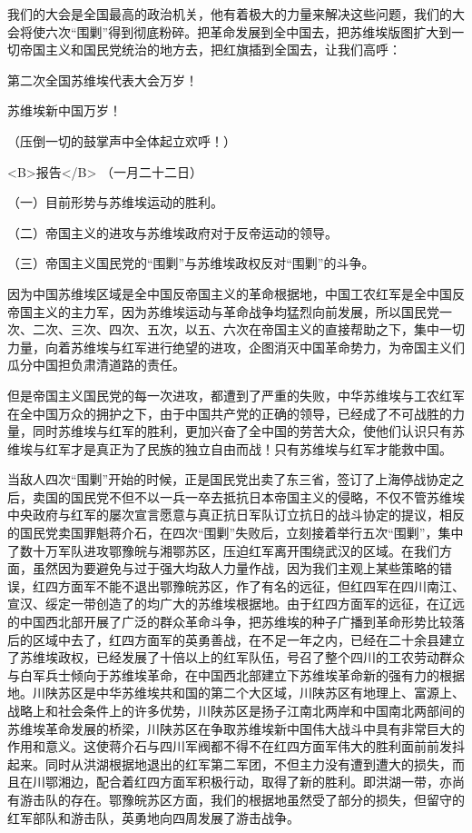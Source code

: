 我们的大会是全国最高的政治机关，他有着极大的力量来解决这些问题，我们的大会将使六次“围剿”得到彻底粉碎。把革命发展到全中国去，把苏维埃版图扩大到一切帝国主义和国民党统治的地方去，把红旗插到全国去，让我们高呼：

第二次全国苏维埃代表大会万岁！

苏维埃新中国万岁！

（压倒一切的鼓掌声中全体起立欢呼！）


<B>报告</B>
（一月二十二日）

（一）目前形势与苏维埃运动的胜利。

（二）帝国主义的进攻与苏维埃政府对于反帝运动的领导。

（三）帝国主义国民党的“围剿”与苏维埃政权反对“围剿”的斗争。

因为中国苏维埃区域是全中国反帝国主义的革命根据地，中国工农红军是全中国反帝国主义的主力军，因为苏维埃运动与革命战争均猛烈向前发展，所以国民党一次、二次、三次、四次、五次，以五、六次在帝国主义的直接帮助之下，集中一切力量，向着苏维埃与红军进行绝望的进攻，企图消灭中国革命势力，为帝国主义们瓜分中国担负肃清道路的责任。

但是帝国主义国民党的每一次进攻，都遭到了严重的失败，中华苏维埃与工农红军在全中国万众的拥护之下，由于中国共产党的正确的领导，已经成了不可战胜的力量，同时苏维埃与红军的胜利，更加兴奋了全中国的劳苦大众，使他们认识只有苏维埃与红军才是真正为了民族的独立自由而战！只有苏维埃与红军才能救中国。

当敌人四次“围剿”开始的时候，正是国民党出卖了东三省，签订了上海停战协定之后，卖国的国民党不但不以一兵一卒去抵抗日本帝国主义的侵略，不仅不管苏维埃中央政府与红军的屡次宣言愿意与真正抗日军队订立抗日的战斗协定的提议，相反的国民党卖国罪魁蒋介石，在四次“围剿”失败后，立刻接着举行五次“围剿”，集中了数十万军队进攻鄂豫皖与湘鄂苏区，压迫红军离开围绕武汉的区域。在我们方面，虽然因为要避免与过于强大均敌人力量作战，因为我们主观上某些策略的错误，红四方面军不能不退出鄂豫皖苏区，作了有名的远征，但红四军在四川南江、宣汉、绥定一带创造了的均广大的苏维埃根据地。由于红四方面军的远征，在辽远的中国西北部开展了广泛的群众革命斗争，把苏维埃的种子广播到革命形势比较落后的区域中去了，红四方面军的英勇善战，在不足一年之内，已经在二十余县建立了苏维埃政权，已经发展了十倍以上的红军队伍，号召了整个四川的工农劳动群众与白军兵士倾向于苏维埃革命，在中国西北部建立下苏维埃革命新的强有力的根据地。川陕苏区是中华苏维埃共和国的第二个大区域，川陕苏区有地理上、富源上、战略上和社会条件上的许多优势，川陕苏区是扬子江南北两岸和中国南北两部间的苏维埃革命发展的桥梁，川陕苏区在争取苏维埃新中国伟大战斗中具有非常巨大的作用和意义。这使蒋介石与四川军阀都不得不在红四方面军伟大的胜利面前前发抖起来。同时从洪湖根据地退出的红军第二军团，不但主力没有遭到遭大的损失，而且在川鄂湘边，配合着红四方面军积极行动，取得了新的胜利。即洪湖一带，亦尚有游击队的存在。鄂豫皖苏区方面，我们的根据地虽然受了部分的损失，但留守的红军部队和游击队，英勇地向四周发展了游击战争。


